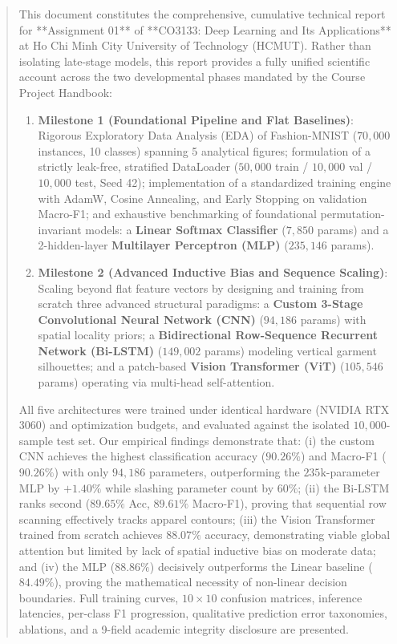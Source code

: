\documentclass[11pt, a4paper]{article}
\begin{document}
\begin{abstract}
\noindent
This document constitutes the comprehensive, cumulative technical report for **Assignment 01** of **CO3133: Deep Learning and Its Applications** at Ho Chi Minh City University of Technology (HCMUT). Rather than isolating late-stage models, this report provides a fully unified scientific account across the two developmental phases mandated by the Course Project Handbook:
\begin{enumerate}[noitemsep]
  \item \textbf{Milestone 1 (Foundational Pipeline and Flat Baselines)}: Rigorous Exploratory Data Analysis (EDA) of Fashion-MNIST ($70{,}000$ instances, 10 classes) spanning 5 analytical figures; formulation of a strictly leak-free, stratified DataLoader ($50{,}000$ train / $10{,}000$ val / $10{,}000$ test, Seed 42); implementation of a standardized training engine with AdamW, Cosine Annealing, and Early Stopping on validation Macro-F1; and exhaustive benchmarking of foundational permutation-invariant models: a \textbf{Linear Softmax Classifier} ($7{,}850$ params) and a 2-hidden-layer \textbf{Multilayer Perceptron (MLP)} ($235{,}146$ params).
  \item \textbf{Milestone 2 (Advanced Inductive Bias and Sequence Scaling)}: Scaling beyond flat feature vectors by designing and training from scratch three advanced structural paradigms: a \textbf{Custom 3-Stage Convolutional Neural Network (CNN)} ($94{,}186$ params) with spatial locality priors; a \textbf{Bidirectional Row-Sequence Recurrent Network (Bi-LSTM)} ($149{,}002$ params) modeling vertical garment silhouettes; and a patch-based \textbf{Vision Transformer (ViT)} ($105{,}546$ params) operating via multi-head self-attention.
\end{enumerate}
All five architectures were trained under identical hardware (NVIDIA RTX 3060) and optimization budgets, and evaluated against the isolated $10{,}000$-sample test set. Our empirical findings demonstrate that: (i) the custom CNN achieves the highest classification accuracy ($90.26\%$) and Macro-F1 ($90.26\%$) with only $94{,}186$ parameters, outperforming the $235\text{k}$-parameter MLP by $+1.40\%$ while slashing parameter count by $60\%$; (ii) the Bi-LSTM ranks second ($89.65\%$ Acc, $89.61\%$ Macro-F1), proving that sequential row scanning effectively tracks apparel contours; (iii) the Vision Transformer trained from scratch achieves $88.07\%$ accuracy, demonstrating viable global attention but limited by lack of spatial inductive bias on moderate data; and (iv) the MLP ($88.86\%$) decisively outperforms the Linear baseline ($84.49\%$), proving the mathematical necessity of non-linear decision boundaries. Full training curves, $10 \times 10$ confusion matrices, inference latencies, per-class F1 progression, qualitative prediction error taxonomies, ablations, and a 9-field academic integrity disclosure are presented.
\end{abstract}
\end{document}
